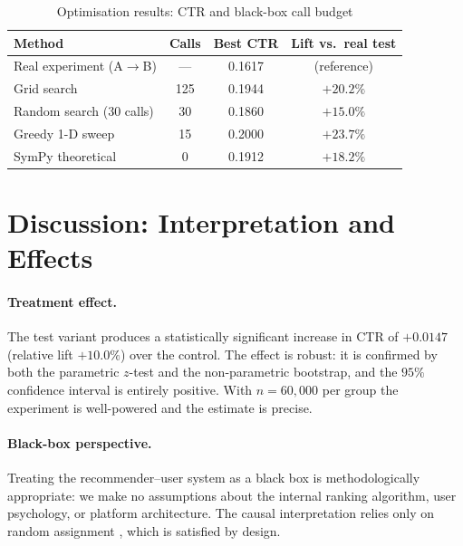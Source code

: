 \documentclass[a4paper,12pt]{extarticle}
\numberwithin{equation}{section}
\begin{document}
\begin{table}[ht]
\centering
\caption{Optimisation results: CTR and black-box call budget}
\label{tab:optim}
\begin{tabular}{lccc}
\toprule
\textbf{Method} & \textbf{Calls} & \textbf{Best CTR}
    & \textbf{Lift vs.\ real test} \\
\midrule
Real experiment (A$\to$B) & ---  & 0.1617 & (reference) \\
Grid search               & 125  & 0.1944 & $+20.2\%$   \\
Random search (30 calls)  & 30   & 0.1860 & $+15.0\%$   \\
Greedy 1-D sweep          & 15   & 0.2000 & $+23.7\%$   \\
SymPy theoretical         & 0    & 0.1912 & $+18.2\%$   \\
\bottomrule
\end{tabular}
\end{table}

\clearpage

\section*{Discussion: Interpretation and Effects}

\paragraph{Treatment effect.} The test variant produces a
statistically significant increase in CTR of $+0.0147$
(relative lift $+10.0\%$) over the control. The effect is
robust: it is confirmed by both the parametric $z$-test and
the non-parametric bootstrap, and the $95\%$ confidence
interval is entirely positive. With $n = 60{,}000$ per group
the experiment is well-powered and the estimate is precise.

\paragraph{Black-box perspective.} Treating the
recommender--user system as a black box is methodologically
appropriate: we make no assumptions about the internal ranking
algorithm, user psychology, or platform architecture. The
causal interpretation relies only on random assignment
\cite{rubin1999teaching}, which is satisfied by design.
\end{document}

